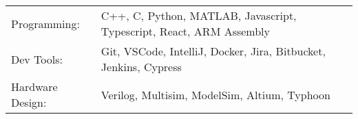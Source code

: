 \begin{tabularx}{\linewidth}{@{}l X@{}}
Programming: &  \normalsize{C++, C, Python, MATLAB, Javascript, Typescript, React, ARM Assembly}\\
Dev Tools:  &  \normalsize{Git, VSCode, IntelliJ, Docker, Jira, Bitbucket, Jenkins, Cypress}\\
Hardware Design: & \normalsize{Verilog, Multisim, ModelSim, Altium, Typhoon} \\
\end{tabularx}